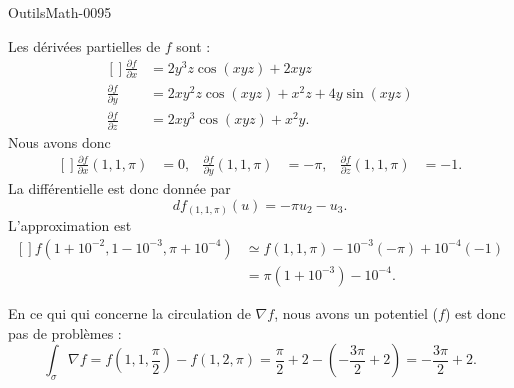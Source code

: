 
\begin{corrige}{OutilsMath-0095}

    Les dérivées partielles de $f$ sont :
    \begin{equation}
        \begin{aligned}[]
            \frac{ \partial f }{ \partial x }&=2y^3z\cos(xyz)+2xyz\\
            \frac{ \partial f }{ \partial y }&=2xy^2z\cos(xyz)+x^2z+4y\sin(xyz)\\
            \frac{ \partial f }{ \partial z }&=2xy^3\cos(xyz)+x^2y.
        \end{aligned}
    \end{equation}
    Nous avons donc
    \begin{equation}
        \begin{aligned}[]
            \frac{ \partial f }{ \partial x }(1,1,\pi)&=0,&\frac{ \partial f }{ \partial y }(1,1,\pi)&=-\pi,&\frac{ \partial f }{ \partial z }(1,1,\pi)&=-1.
        \end{aligned}
    \end{equation}
    La différentielle est donc donnée par
    \begin{equation}
        df_{(1,1,\pi)}(u)=-\pi u_2-u_3.
    \end{equation}
    L'approximation est
    \begin{equation}
        \begin{aligned}[]
            f(1+10^{-2},1-10^{-3},\pi+10^{-4})&\simeq f(1,1,\pi)-10^{-3}(-\pi)+10^{-4}(-1)\\
                    &=\pi(1+10^{-3})-10^{-4}.
        \end{aligned}
    \end{equation}
    
    En ce qui qui concerne la circulation de $\nabla f$, nous avons un potentiel ($f$) est donc pas de problèmes :
    \begin{equation}
        \int_{\sigma}\nabla f=f(1,1,\frac{ \pi }{2})-f(1,2,\pi)=\frac{ \pi }{2}+2-\left( -\frac{ 3\pi }{2}+2 \right)=-\frac{ 3\pi }{2}+2.
    \end{equation}


\end{corrige}
